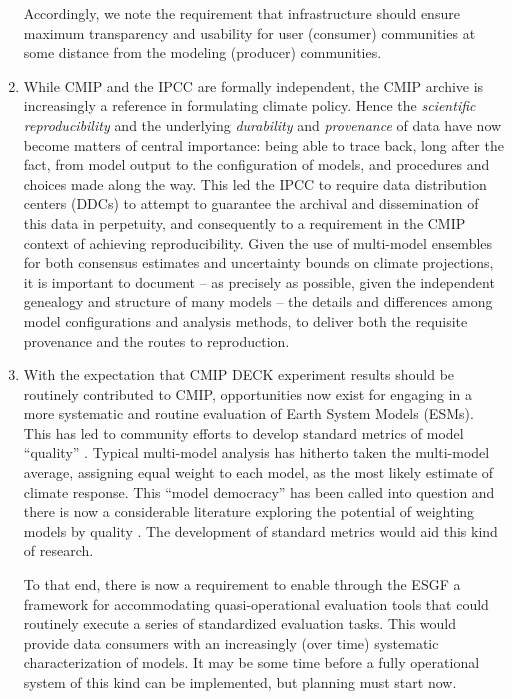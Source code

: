 \documentclass[gmd,manuscript]{copernicus}
\newcommand{\pllabel}[1]{\label{p-#1}\linelabel{l-#1}}
\begin{document}
\begin{enumerate}
  Accordingly, we note the requirement that infrastructure should
  ensure maximum transparency and usability for user (consumer)
  communities at some distance from the modeling (producer)
  communities.
\item\label{repro} While CMIP and the IPCC are formally independent,
  the CMIP archive is increasingly a reference in formulating climate
  policy. Hence the \emph{scientific reproducibility}
  \citep{ref:collinstabak2014} and the underlying \emph{durability}
  and \emph{provenance} of data have now become matters of central
  importance: being able to trace
  \pllabel{RC2-15}
  back, long after the fact, from model output to the configuration of
  models, and procedures and choices made along the way. This led the
  IPCC to require data distribution centers (DDCs) to attempt to
  guarantee the archival and dissemination of this data in perpetuity,
  and consequently to a requirement in the CMIP context of
  achieving reproducibility. Given the use of multi-model ensembles
  for both consensus estimates and uncertainty bounds on climate
  projections, it is important to document -- as precisely as
  possible, given the independent genealogy and structure of many
  models -- the details and differences among model configurations and
  analysis methods, to deliver both the requisite provenance and the
  routes to reproduction.
\item\label{analysis} With the expectation that CMIP DECK experiment
  results should be routinely contributed to CMIP, opportunities now
  exist for engaging in a more systematic and routine evaluation of
  Earth System Models (ESMs). This has led to community efforts to
  develop standard metrics of model ``quality''
  \citep{ref:eyringetal2016,ref:gleckleretal2016}.
  \pllabel{RC2-16}
  Typical multi-model analysis has hitherto taken the multi-model
  average, assigning equal weight to each model, as the most likely
  estimate of climate response. This ``model democracy''
  \citep{ref:knutti2010} has been called into question and there is
  now a considerable literature exploring the potential of weighting
  models by quality \citep{ref:knuttietal2017}. The development of
  standard metrics would aid this kind of research.

  To that end, there is now a requirement to enable through the ESGF a
  framework for accommodating quasi-operational evaluation tools that
  could routinely execute a series of standardized evaluation tasks.
  This would provide data consumers with an increasingly (over time)
  systematic characterization of models. It may be some time before a
  fully operational system of this kind can be implemented, but
  planning must start now.


\end{enumerate}
\end{document}

